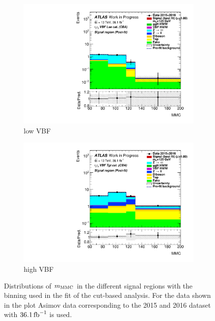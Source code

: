 \begin{figure}[htb]
\begin{subfigure}[t]{0.45\textwidth}
        \includegraphics[width=\textwidth]{./plots/fit/cba/sig_vbfloose.pdf}
        \caption{low VBF}
    \end{subfigure}
    \begin{subfigure}[t]{0.45\textwidth}
        \includegraphics[width=\textwidth]{./plots/fit/cba/sig_vbftight.pdf}
        \caption{high VBF}
    \end{subfigure}
    \caption{Distributions of $m_\text{MMC}$ in the different signal regions with the binning used in the fit of the cut-based analysis.
             For the data shown in the plot Asimov data corresponding to the 2015 and 2016 dataset with $\SI{36.1}{\invfb}$ is used.}\label{fig:fit:input:cba:SR}
\end{figure}

